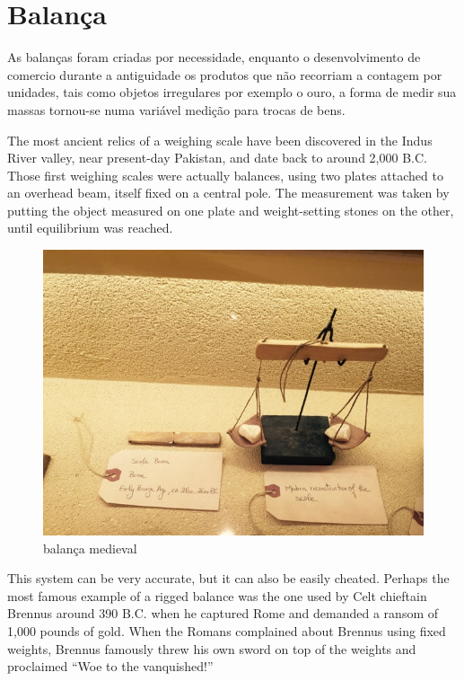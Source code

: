 \chapter{Balança}
As balanças foram criadas por necessidade, enquanto o desenvolvimento de comercio durante a antiguidade os produtos que não recorriam a contagem por unidades, tais como objetos irregulares por exemplo o ouro, a forma de medir sua massas tornou-se numa variável medição para trocas de bens.

 The most ancient relics of a weighing scale have been discovered in the Indus River valley, near present-day Pakistan, and date back to around 2,000 B.C. Those first weighing scales were actually balances, using two plates attached to an overhead beam, itself fixed on a central pole. The measurement was taken by putting the object measured on one plate and weight-setting stones on the other, until equilibrium was reached.
\\
\begin{figure}[H]
	\centering
	\includegraphics[scale=0.52]{./image/PESTA/general/balanca_1.jpg}
	\caption{balança medieval}
	\label{Balanca_1}
\end{figure}
This system can be very accurate, but it can also be easily cheated. Perhaps the most famous example of a rigged balance was the one used by Celt chieftain Brennus around 390 B.C. when he captured Rome and demanded a ransom of 1,000 pounds of gold. When the Romans complained about Brennus using fixed weights, Brennus famously threw his own sword on top of the weights and proclaimed “Woe to the vanquished!”
